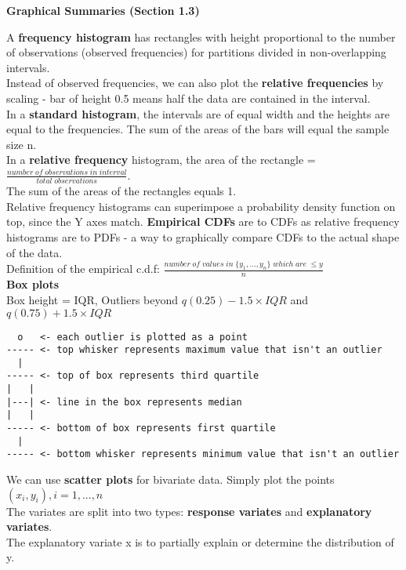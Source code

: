 \documentclass[a4paper,12pt]{article}
\begin{document}
\newpage
\textbf{Graphical Summaries (Section 1.3)}
\bigskip

A \textbf{frequency histogram} has rectangles with height proportional to the number of observations (observed frequencies) for partitions divided in non-overlapping intervals. 
\\Instead of observed frequencies, we can also plot the \textbf{relative
frequencies} by scaling - bar of
height 0.5 means half the data are contained in the interval.
\\

In a \textbf{standard histogram}, the intervals are of equal width and the
heights are equal to the frequencies. The sum of the areas of the bars will equal the sample size n.
\\

In a \textbf{relative frequency} histogram, the area of the rectangle = $\frac{number \; of \; observations \; in \; interval}{total \; observations}$. 
\\The sum of the areas of the rectangles equals 1.
\\

Relative frequency histograms can superimpose a probability density function on top, since the Y axes match. \textbf{Empirical CDFs} are to CDFs as relative frequency histograms are to PDFs - a way to graphically compare CDFs to the actual shape of the data.
\\

Definition of the empirical c.d.f: $\frac{number \; of \; values \; in \; \{y_1, ..., y_n\} \; which \; are \; \leq y}{n}$
\\

\textbf{Box plots}
\\Box height = IQR, Outliers beyond $q(0.25) - 1.5\times IQR$ and $q(0.75) + 1.5\times IQR$
\\
\begin{verbatim}
  o   <- each outlier is plotted as a point
----- <- top whisker represents maximum value that isn't an outlier
  |
----- <- top of box represents third quartile
|   |
|---| <- line in the box represents median
|   |
----- <- bottom of box represents first quartile
  |
----- <- bottom whisker represents minimum value that isn't an outlier
\end{verbatim}
\bigskip

We can use \textbf{scatter plots} for bivariate data. Simply plot the points $(x_i , y_i ), i = 1, ..., n$
\\The variates are split into two types: \textbf{response variates} and \textbf{explanatory variates}.
\\The explanatory variate x is to partially explain or
determine the distribution of y.
\bigskip
\\
\end{document}
